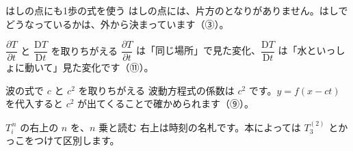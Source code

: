 \begin{tsumazuki}{はしの点にも1歩の式を使う}
はしの点には、片方のとなりがありません。はしでどうなっているかは、外から決まっています（③）。
\end{tsumazuki}

\begin{tsumazuki}{$\dfrac{\partial T}{\partial t}$ と $\dfrac{\mathrm DT}{\mathrm Dt}$ を取りちがえる}
$\dfrac{\partial T}{\partial t}$ は「同じ場所」で見た変化、$\dfrac{\mathrm DT}{\mathrm Dt}$ は「水といっしょに動いて」見た変化です（⑪）。
\end{tsumazuki}

\begin{tsumazuki}{波の式で $c$ と $c^2$ を取りちがえる}
波動方程式の係数は $c^2$ です。$y=f(x-ct)$ を代入すると $c^2$ が出てくることで確かめられます（⑨）。
\end{tsumazuki}

\begin{tsumazuki}{$T_i^{\,n}$ の右上の $n$ を、$n$ 乗と読む}
右上は時刻の名札です。本によっては $T_3^{(2)}$ とかっこをつけて区別します。
\end{tsumazuki}

